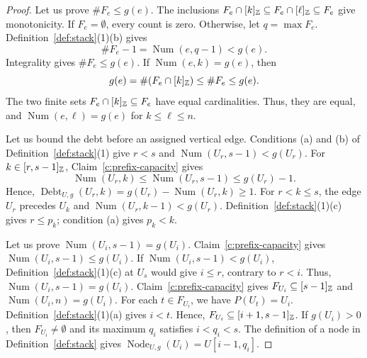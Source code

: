 \begin{proof}
 Let us prove $\#F_e\le g(e)$.
The inclusions $F_e\cap[k]_{\mathbb Z}\subseteq F_e\cap[\ell]_{\mathbb Z}\subseteq F_e$
give monotonicity. If $F_e=\emptyset$, every count is zero.
Otherwise, let $q=\max F_e$. Definition~\ref{def:stack}(1)(b) gives
\[
 \#F_e-1=\operatorname{Num}(e,q-1)<g(e).
\]
Integrality gives $\#F_e\le g(e)$. If $\operatorname{Num}(e,k)=g(e)$, then
\[
 g(e)=\#(F_e\cap[k]_{\mathbb Z})\le\#F_e\le g(e).
\]
The two finite sets $F_e\cap[k]_{\mathbb Z}\subseteq F_e$ have equal cardinalities. Thus, they are equal, and $\operatorname{Num}(e,\ell)=g(e)$ for $k\le\ell\le n$.

 Let us bound the debt before an assigned vertical edge.
Conditions (a) and (b) of Definition~\ref{def:stack}(1) give
$r<s$ and $\operatorname{Num}(U_r,s-1)<g(U_r)$.
For $k\in[r,s-1]_{\mathbb Z}$, Claim~\ref{c:prefix-capacity} gives
\[
 \operatorname{Num}(U_r,k)\le \operatorname{Num}(U_r,s-1)\le g(U_r)-1.
\]
Hence, $\operatorname{Debt}_{U,g}(U_r,k)=g(U_r)-\operatorname{Num}(U_r,k)\ge1$.
For $r<k\le s$, the edge $U_r$ precedes $U_k$ and
$\operatorname{Num}(U_r,k-1)<g(U_r)$. Definition~\ref{def:stack}(1)(c) gives $r\le p_k$;
condition (a) gives $p_k<k$.

 Let us prove $\operatorname{Num}(U_i,s-1)=g(U_i)$.
Claim~\ref{c:prefix-capacity} gives $\operatorname{Num}(U_i,s-1)\le g(U_i)$.
If $\operatorname{Num}(U_i,s-1)<g(U_i)$, Definition~\ref{def:stack}(1)(c) at $U_s$
would give $i\le r$, contrary to $r<i$.
Thus, $\operatorname{Num}(U_i,s-1)=g(U_i)$.
Claim~\ref{c:prefix-capacity} gives $F_{U_i}\subseteq[s-1]_{\mathbb Z}$ and $\operatorname{Num}(U_i,n)=g(U_i)$.
For each $t\in F_{U_i}$, we have $P(U_t)=U_i$. Definition~\ref{def:stack}(1)(a) gives $i<t$.
Hence, $F_{U_i}\subseteq[i+1,s-1]_{\mathbb Z}$.
If $g(U_i)>0$, then $F_{U_i}\ne\emptyset$ and its maximum $q_i$ satisfies
$i<q_i<s$. The definition of a node in Definition~\ref{def:stack}
gives $\operatorname{Node}_{U,g}(U_i)=U[i-1,q_i]$.
\end{proof}

